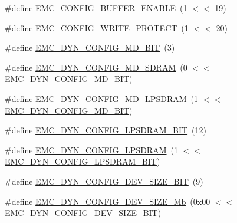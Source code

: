 \begin{DoxyCompactItemize}
\item 
\#define \hyperlink{group___e_m_c__18_x_x__43_x_x_ga133b8e3be0dcf6a707bba15b38f69f21}{E\+M\+C\+\_\+\+C\+O\+N\+F\+I\+G\+\_\+\+B\+U\+F\+F\+E\+R\+\_\+\+E\+N\+A\+B\+LE}~(1 $<$$<$ 19)
\item 
\#define \hyperlink{group___e_m_c__18_x_x__43_x_x_ga7880f25f9b3e612d71fea39428629968}{E\+M\+C\+\_\+\+C\+O\+N\+F\+I\+G\+\_\+\+W\+R\+I\+T\+E\+\_\+\+P\+R\+O\+T\+E\+CT}~(1 $<$$<$ 20)
\item 
\#define \hyperlink{group___e_m_c__18_x_x__43_x_x_gae9156f48d47235676ccad59d8e90b304}{E\+M\+C\+\_\+\+D\+Y\+N\+\_\+\+C\+O\+N\+F\+I\+G\+\_\+\+M\+D\+\_\+\+B\+IT}~(3)
\item 
\#define \hyperlink{group___e_m_c__18_x_x__43_x_x_ga3871ea81a7fbff4d53f685f4148e1f88}{E\+M\+C\+\_\+\+D\+Y\+N\+\_\+\+C\+O\+N\+F\+I\+G\+\_\+\+M\+D\+\_\+\+S\+D\+R\+AM}~(0 $<$$<$ \hyperlink{group___e_m_c__18_x_x__43_x_x_gae9156f48d47235676ccad59d8e90b304}{E\+M\+C\+\_\+\+D\+Y\+N\+\_\+\+C\+O\+N\+F\+I\+G\+\_\+\+M\+D\+\_\+\+B\+IT})
\item 
\#define \hyperlink{group___e_m_c__18_x_x__43_x_x_ga7de498eb3f4f650407c8f266ea3b87e5}{E\+M\+C\+\_\+\+D\+Y\+N\+\_\+\+C\+O\+N\+F\+I\+G\+\_\+\+M\+D\+\_\+\+L\+P\+S\+D\+R\+AM}~(1 $<$$<$ \hyperlink{group___e_m_c__18_x_x__43_x_x_gae9156f48d47235676ccad59d8e90b304}{E\+M\+C\+\_\+\+D\+Y\+N\+\_\+\+C\+O\+N\+F\+I\+G\+\_\+\+M\+D\+\_\+\+B\+IT})
\item 
\#define \hyperlink{group___e_m_c__18_x_x__43_x_x_gaa6cb9cf553976072b0aa5993c7304e5f}{E\+M\+C\+\_\+\+D\+Y\+N\+\_\+\+C\+O\+N\+F\+I\+G\+\_\+\+L\+P\+S\+D\+R\+A\+M\+\_\+\+B\+IT}~(12)
\item 
\#define \hyperlink{group___e_m_c__18_x_x__43_x_x_ga13c9cb74d44d8594fd967c87e4a31a8e}{E\+M\+C\+\_\+\+D\+Y\+N\+\_\+\+C\+O\+N\+F\+I\+G\+\_\+\+L\+P\+S\+D\+R\+AM}~(1 $<$$<$ \hyperlink{group___e_m_c__18_x_x__43_x_x_gaa6cb9cf553976072b0aa5993c7304e5f}{E\+M\+C\+\_\+\+D\+Y\+N\+\_\+\+C\+O\+N\+F\+I\+G\+\_\+\+L\+P\+S\+D\+R\+A\+M\+\_\+\+B\+IT})
\item 
\#define \hyperlink{group___e_m_c__18_x_x__43_x_x_gaa38270183a865b186fe61134aa5c3146}{E\+M\+C\+\_\+\+D\+Y\+N\+\_\+\+C\+O\+N\+F\+I\+G\+\_\+\+D\+E\+V\+\_\+\+S\+I\+Z\+E\+\_\+\+B\+IT}~(9)
\item 
\#define \hyperlink{group___e_m_c__18_x_x__43_x_x_ga739f046eeda15a2b4cf7eaaef985e9fb}{E\+M\+C\+\_\+\+D\+Y\+N\+\_\+\+C\+O\+N\+F\+I\+G\+\_\+\+D\+E\+V\+\_\+\+S\+I\+Z\+E\+\_\+Mb}~(0x00 $<$$<$ E\+M\+C\+\_\+\+D\+Y\+N\+\_\+\+C\+O\+N\+F\+I\+G\+\_\+\+D\+E\+V\+\_\+\+S\+I\+Z\+E\+\_\+\+B\+I\+T)
\item 

\end{DoxyCompactItemize}

